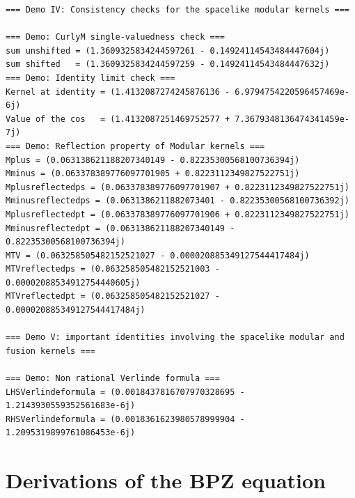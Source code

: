 \documentclass[11pt]{article}
\begin{document}
\begin{lstlisting}
=== Demo IV: Consistency checks for the spacelike modular kernels ===

=== Demo: CurlyM single-valuedness check ===
sum unshifted = (1.3609325834244597261 - 0.14924114543484447604j)
sum shifted   = (1.3609325834244597259 - 0.14924114543484447632j)
=== Demo: Identity limit check ===
Kernel at identity = (1.4132087274245876136 - 6.9794754220596457469e-6j)
Value of the cos   = (1.4132087251469752577 + 7.3679348136474341459e-7j)
=== Demo: Reflection property of Modular kernels ===
Mplus = (0.063138621188207340149 - 0.82235300568100736394j)
Mminus = (0.063378389776097701905 + 0.8223112349827522751j)
Mplusreflectedps = (0.063378389776097701907 + 0.8223112349827522751j)
Mminusreflectedps = (0.0631386211882073401 - 0.82235300568100736392j)
Mplusreflectedpt = (0.063378389776097701906 + 0.8223112349827522751j)
Mminusreflectedpt = (0.063138621188207340149 - 0.82235300568100736394j)
MTV = (0.063258505482152521027 - 0.000020885349127544417484j)
MTVreflectedps = (0.063258505482152521003 - 0.00002088534912754440605j)
MTVreflectedpt = (0.063258505482152521027 - 0.000020885349127544417484j)

=== Demo V: important identities involving the spacelike modular and fusion kernels ===

=== Demo: Non rational Verlinde formula ===
LHSVerlindeformula = (0.0018437816707970328695 - 1.2143930559352561683e-6j)
RHSVerlindeformula = (0.0018361623980578999904 - 1.2095319899761086453e-6j)
\end{lstlisting}

\appendix
\section{Derivations of the BPZ equation}
\end{document}

